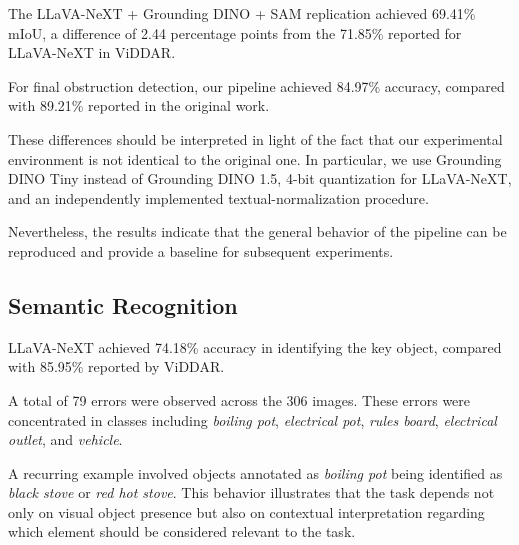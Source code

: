 \documentclass[conference]{IEEEtran}
\begin{document}
The LLaVA-NeXT + Grounding DINO + SAM replication achieved 69.41\% mIoU, a difference of 2.44 percentage points from the 71.85\% reported for LLaVA-NeXT in ViDDAR.

For final obstruction detection, our pipeline achieved 84.97\% accuracy, compared with 89.21\% reported in the original work.

These differences should be interpreted in light of the fact that our experimental environment is not identical to the original one. In particular, we use Grounding DINO Tiny instead of Grounding DINO 1.5, 4-bit quantization for LLaVA-NeXT, and an independently implemented textual-normalization procedure.

Nevertheless, the results indicate that the general behavior of the pipeline can be reproduced and provide a baseline for subsequent experiments.



\subsection{Semantic Recognition}

LLaVA-NeXT achieved 74.18\% accuracy in identifying the key object, compared with 85.95\% reported by ViDDAR.

A total of 79 errors were observed across the 306 images. These errors were concentrated in classes including \textit{boiling pot}, \textit{electrical pot}, \textit{rules board}, \textit{electrical outlet}, and \textit{vehicle}.

A recurring example involved objects annotated as \textit{boiling pot} being identified as \textit{black stove} or \textit{red hot stove}. This behavior illustrates that the task depends not only on visual object presence but also on contextual interpretation regarding which element should be considered relevant to the task.
\end{document}
